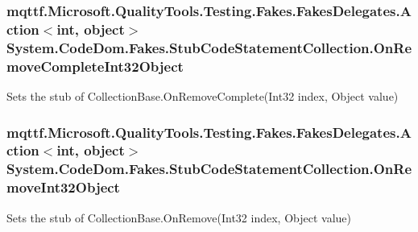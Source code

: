 \hypertarget{class_system_1_1_code_dom_1_1_fakes_1_1_stub_code_statement_collection_a349f41afda6287b317149ee9d70e83ef}{
\subsubsection[{On\-Remove\-Complete\-Int32\-Object}]{\setlength{\rightskip}{0pt plus 5cm}mqttf.\-Microsoft.\-Quality\-Tools.\-Testing.\-Fakes.\-Fakes\-Delegates.\-Action$<$int, object$>$ System.\-Code\-Dom.\-Fakes.\-Stub\-Code\-Statement\-Collection.\-On\-Remove\-Complete\-Int32\-Object}}\label{class_system_1_1_code_dom_1_1_fakes_1_1_stub_code_statement_collection_a349f41afda6287b317149ee9d70e83ef}


Sets the stub of Collection\-Base.\-On\-Remove\-Complete(\-Int32 index, Object value)

\hypertarget{class_system_1_1_code_dom_1_1_fakes_1_1_stub_code_statement_collection_a6d9c87d2455456a6ddbf896c8fdaf5f4}{
\subsubsection[{On\-Remove\-Int32\-Object}]{\setlength{\rightskip}{0pt plus 5cm}mqttf.\-Microsoft.\-Quality\-Tools.\-Testing.\-Fakes.\-Fakes\-Delegates.\-Action$<$int, object$>$ System.\-Code\-Dom.\-Fakes.\-Stub\-Code\-Statement\-Collection.\-On\-Remove\-Int32\-Object}}\label{class_system_1_1_code_dom_1_1_fakes_1_1_stub_code_statement_collection_a6d9c87d2455456a6ddbf896c8fdaf5f4}


Sets the stub of Collection\-Base.\-On\-Remove(\-Int32 index, Object value)

